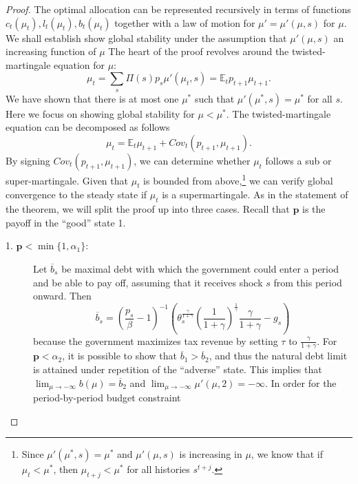 \documentclass[12pt]{article}
\newcommand{\dge}[1]{\textcolor{blue}{$^{\textrm{dge}}${#1}}}
\newcommand{\tjs}[1]{\textcolor{red}{$^{\textrm{tjs}}${#1}}}
\newcommand{\EE}{\mathbb E}
\begin{document}
\begin{proof}
The optimal allocation can be represented recursively in terms of  functions $c_t(\mu_t),l_t(\mu_t), b_t(\mu_t)$ together  with a law of motion for $\mu' = \mu'(\mu,s)$ for $\mu$.
We shall establish show global stability under the assumption that $\mu'(\mu,s)$ an increasing function of $\mu$
The heart of the proof revolves around the twisted-martingale equation for $\mu$:
\[
	\mu_t = \sum_s \Pi(s) p_s \mu'(\mu_t,s) = \EE_t p_{t+1}\mu_{t+1}.
\]  We have shown that there is at most one $\mu^*$ such that $\mu'(\mu^*,s) = \mu^*$ for all $s$.  Here we focus on showing global stability for $\mu < \mu^*$. The twisted-martingale equation can be decomposed as follows
\[
	\mu_t = \EE_t \mu_{t+1}+Cov_t(p_{t+1},\mu_{t+1}).
\] By signing $Cov_t(p_{t+1},\mu_{t+1})$,  we can determine whether $\mu_t$ follows a sub or super-martingale.  Given that $\mu_t$ is bounded from above,\footnote{Since  $\mu'(\mu^*,s) = \mu^*$ and $\mu'(\mu,s)$ is increasing in $\mu$,  we know that if $\mu_t < \mu^*$, then $\mu_{t+j} < \mu^*$ for all histories $s^{t+j}$.} we can verify global convergence to the steady state if $\mu_t$ is a supermartingale.  As in the statement of the theorem, we will split the proof up into three cases. Recall that $\bm p$ is the payoff in the ``good'' state 1.
\begin{description}
	\item[1. $\bm p < \min\{1,\alpha_1\}$:]  Let $\overline b_s$ be maximal debt with which the government %
 could enter a period and be able to pay off, assuming that  it  receives shock $s$ from this period onward. Then
	\[
	\overline b_s = \left(\frac{p_s}{\beta}-1\right)^{-1}\left(\theta_s^\frac{\gamma}{1+\gamma}\left(\frac1{1+\gamma}\right)^\frac1\gamma\frac\gamma{1+\gamma}-g_s\right)
	\] because the government maximizes tax revenue  by setting %
 $\tau$ to $\frac\gamma{1+\gamma}$. %
 For $\bm p <\alpha_2$, it is possible to show that $\overline b_1 > \overline b_2$, and thus the natural debt limit is attained under repetition of the ``adverse'' state.  This implies that $\lim_{\mu\rightarrow-\infty} b(\mu) = \overline b_2$ and  $\lim_{\mu\rightarrow-\infty} \mu'(\mu,2) = -\infty$.  In order for the period-by-period budget constraint

\end{description}
\end{proof}
\end{document}
